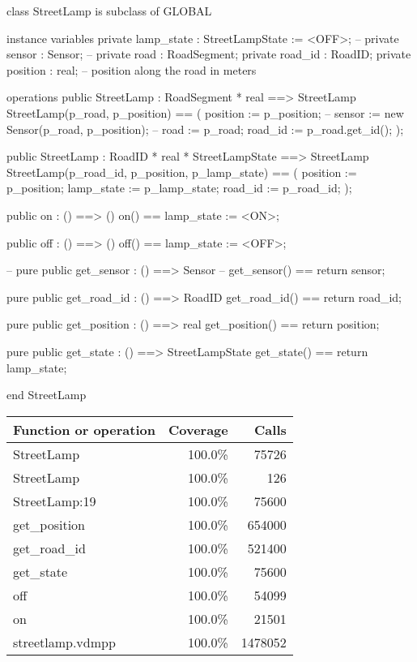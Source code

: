 \documentclass[a4paper]{article}
\begin{document}
\title{}
\author{}
\begin{vdm_al}
class StreetLamp is subclass of GLOBAL

instance variables
    private lamp_state : StreetLampState := <OFF>;
    -- private sensor : Sensor;
    -- private road : RoadSegment;
    private road_id : RoadID;
    private position : real; -- position along the road in meters

operations
    public StreetLamp : RoadSegment * real ==> StreetLamp
    StreetLamp(p_road, p_position) == (
        position := p_position;
        -- sensor := new Sensor(p_road, p_position);
        -- road := p_road;
        road_id := p_road.get_id();
    );

    public StreetLamp : RoadID * real * StreetLampState ==> StreetLamp
    StreetLamp(p_road_id, p_position, p_lamp_state) == (
        position := p_position;
        lamp_state := p_lamp_state;
        road_id := p_road_id;
    );

    public on : () ==> ()
    on() == lamp_state := <ON>;

    public off : () ==> ()
    off() == lamp_state := <OFF>;

    -- pure public get_sensor : () ==> Sensor
    -- get_sensor() == return sensor;

    pure public get_road_id : () ==> RoadID
    get_road_id() == return road_id;

    pure public get_position : () ==> real
    get_position() == return position;

    pure public get_state : () ==> StreetLampState
    get_state() == return lamp_state;

end StreetLamp
\end{vdm_al}
\bigskip
\begin{longtable}{|l|r|r|}
\hline
Function or operation & Coverage & Calls \\
\hline
\hline
StreetLamp & 100.0\% & 75726 \\
\hline
StreetLamp & 100.0\% & 126 \\
\hline
StreetLamp:19 & 100.0\% & 75600 \\
\hline
get\_position & 100.0\% & 654000 \\
\hline
get\_road\_id & 100.0\% & 521400 \\
\hline
get\_state & 100.0\% & 75600 \\
\hline
off & 100.0\% & 54099 \\
\hline
on & 100.0\% & 21501 \\
\hline
\hline
streetlamp.vdmpp & 100.0\% & 1478052 \\
\hline
\end{longtable}
\end{document}
